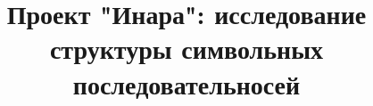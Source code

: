 \documentclass[candidate,subf,href]{disser}
\begin{document}
  \title{Проект "Инара": исследование структуры символьных последовательносей}\maketitle
  \tableofcontents
  
  
  
\end{document}
